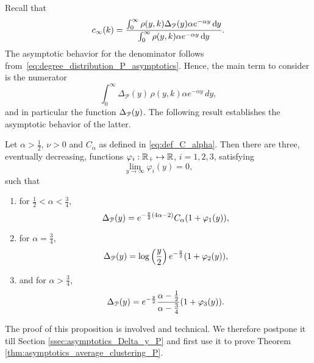 Recall that
\[
	c_\infty(k) = \frac{\int_0^\infty \rho(y,k) \Delta_{{\mathcal P}}(y) \alpha e^{-\alpha y} \operatorname{\mathrm{d}\hspace{-2pt}} y}{\int_0^\infty \rho(y,k) \alpha e^{-\alpha y} \operatorname{\mathrm{d}\hspace{-2pt}} y}.
\]
The asymptotic behavior for the denominator follows from~\eqref{eq:degree_distribution_P_asymptotics}. Hence, the main term to consider is the numerator
\[
	\int_0^{\infty} \Delta_{\mathcal{P}}(y) \, \rho(y,k) \alpha e^{-\alpha y} \, dy,
\]
and in particular the function $\Delta_{{\mathcal P}}(y)$. The following result establishes the asymptotic behavior of the latter.

\begin{proposition}\label{prop:asymptotics_Delta_y_P}
Let $\alpha > \frac{1}{2}$, $\nu > 0$ and $C_\alpha$ as defined in \eqref{eq:def_C_alpha}. Then there are three, eventually decreasing, functions $\varphi_i : {\mathbb R}_+ \mapsto {\ensuremath{\mathbb R}}$, $i = 1,2,3$, satisfying
\[
	\lim_{y \to \infty} \varphi_i(y) = 0, 
\]
such that 
\begin{enumerate}
\item for $\frac{1}{2} < \alpha < \frac{3}{4}$,
\[
	\Delta_{{\mathcal P}}(y) = e^{-\frac{y}{2}(4\alpha - 2)} C_\alpha (1 + \varphi_1(y)),
\]
\item for $\alpha = \frac{3}{4}$,
\[
	\Delta_{{\mathcal P}}(y) = \log\left(\frac{y}{2}\right)e^{-\frac{y}{2}}(1 + \varphi_2(y)),
\]
\item and for $\alpha > \frac{3}{4}$,
\[
	\Delta_{{\mathcal P}}(y) = e^{-\frac{y}{2}} \frac{\alpha - \frac{1}{2}}{\alpha - \frac{3}{4}} (1 + \varphi_3(y)).
\]
\end{enumerate}
\end{proposition}

The proof of this proposition is involved and technical. We therefore postpone it till Section \ref{ssec:asymptotics_Delta_y_P} and first use it to prove Theorem \ref{thm:asymptotics_average_clustering_P}. 

